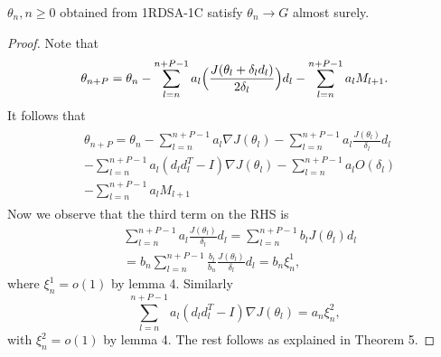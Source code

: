 \begin{theorem}
  $\theta_n, n\geq0$ obtained from 1RDSA-1C satisfy $\theta_n \rightarrow G$
 almost surely.
\end{theorem}
\begin{proof}
Note that
 \begin{align*}
 \theta_{n+P} = \theta_n-\sum_{l=n}^{n+P-1}a_l\Big{(}\frac{J(\theta_l+\delta_l d_l)}{2\delta_l}\Big{)}d_l-\sum_{l=n}^{n+P-1}a_lM_{l+1}.
 \end{align*} 
It follows that
 \begin{align*}
  \begin{split}
  & \theta_{n+P} = \theta_n- \sum_{l=n}^{n+P-1}a_l\nabla J(\theta_l) 
  -\sum_{l=n}^{n+P-1}a_l\frac{J(\theta_l)}{\delta_l}d_l\\
  &-\sum_{l=n}^{n+P-1}a_l(d_ld_l^T-I)\nabla J(\theta_l)-\sum_{l=n}^{n+P-1}a_lO(\delta_l)\\
  &-\sum_{l=n}^{n+P-1}a_lM_{l+1}
 \end{split}
 \end{align*}
 Now we observe that the third term on the RHS is
 \begin{align*}
 & \sum_{l=n}^{n+P-1}a_l\frac{J(\theta_l)}{\delta_l}d_l= \sum_{l=n}^{n+P-1} b_{l}J(\theta_l)d_l\\
 & = b_n\sum_{l=n}^{n+P-1}\frac{b_l}{b_n}\frac{J(\theta_l)}{\delta_l}d_l=b_n\xi^{1}_{n},
 \end{align*}
 where $\xi^{1}_{n}=o(1)$ by lemma 4. Similarly
 $$\sum_{l=n}^{n+P-1}a_l(d_ld_l^T-I)\nabla J(\theta_l)=a_n\xi^{2}_{n},$$
 with $\xi^{2}_{n}=o(1)$ by lemma 4.
 The rest follows as explained in Theorem 5.
\end{proof}
